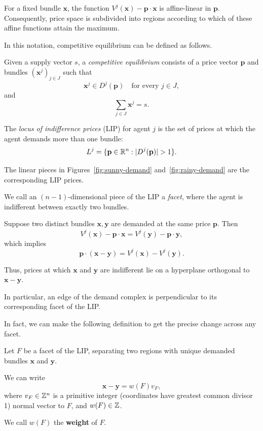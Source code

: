 \documentclass[../../main.tex]{subfiles}
\begin{document}
For a fixed bundle $\mathbf{x}$, the function $V^j(\mathbf{x})-\mathbf{p}\cdot \mathbf{x}$ is affine-linear in 
$\mathbf{p}$. Consequently, price space is subdivided into regions according to which
of these affine functions attain the maximum.

In this notation, competitive equilibrium can be defined as follows.

\begin{defin}
    Given a supply vector $s$, a \textit{competitive equilibrium} consists of
    a price vector $\mathbf{p}$ and bundles $(\mathbf{x}^j)_{j\in J}$ such that
    \[
        \mathbf{x}^j \in D^j(\mathbf{p}) \quad\text{for every } j \in J,
    \]
    and
    \[
        \sum_{j \in J}\mathbf{x}^j=s.
    \]
\end{defin}

\begin{defin}
    The \textit{locus of indifference prices} (LIP) for agent $j$ is the set
    of prices at which the agent demands more than one bundle:
    \[
        L^j = \{\mathbf{p} \in \rr^n : |D^j(\mathbf{p})|>1\}.
    \]

    The linear pieces in Figures~\ref{fig:sunny-demand}
    and~\ref{fig:rainy-demand} are the corresponding LIP prices.

    We call an $(n-1)$-dimensional piece of the LIP a \textit{facet}, where the agent is indifferent between exactly two bundles.
\end{defin}

Suppose two distinct bundles $\mathbf{x},\mathbf{y}$ are demanded at the same
price $\mathbf{p}$. Then
\[
    V^j(\mathbf{x})-\mathbf{p}\cdot \mathbf{x}=V^j(\mathbf{y})-\mathbf{p}\cdot \mathbf{y},
\]
which implies
\[
    \mathbf{p}\cdot(\mathbf{x}-\mathbf{y})=V^j(\mathbf{x})-V^j(\mathbf{y}).
\]

Thus, prices at which $\mathbf{x}$ and $\mathbf{y}$ are indifferent lie
on a hyperplane orthogonal to $\mathbf{x}-\mathbf{y}$.

In particular, an edge of the demand complex is
perpendicular to its corresponding facet of the LIP.

In fact, we can make the following definition to get the precise change across any facet.

\begin{defin}
    Let $F$ be a facet of the LIP, separating two
    regions with unique demanded bundles $\mathbf{x}$ and $\mathbf{y}$.

    We can write
    \[
        \mathbf{x}-\mathbf{y} = w(F)v_F,
    \]
    where $v_F\in\mathbb{Z}^n$ is a primitive integer 
    (coordinates have greatest common divisor 1)
    normal vector to $F$, and $w(F)\in\mathbb{Z}$.

    We call $w(F)$ the \textbf{weight} of $F$.
\end{defin}
\end{document}
